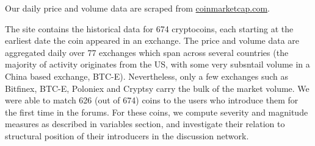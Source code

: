 Our daily price and volume data are scraped from \url{coinmarketcap.com}.

The site contains the historical data for 674 cryptocoins, each starting at the earliest date the coin appeared in an exchange.  The price and volume data are aggregated daily over 77 exchanges which span across several countries (the majority of activity originates from the US, with some very subsntail volume in a China based exchange, BTC-E). Nevertheless, only a few exchanges such as Bitfinex, BTC-E, Poloniex and Cryptsy carry the bulk of the market volume. We were able to match 626 (out of 674) coins to the users who introduce them for the first time in the forums. For these coins, we compute severity and magnitude measures as described in variables section, and investigate their relation to structural position of their introducers in the discussion network. 
